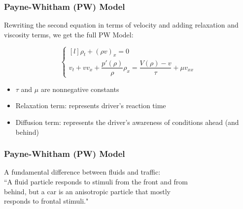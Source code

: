 \documentclass{beamer}
\begin{document}
\begin{frame}
\frametitle{Payne-Whitham (PW) Model}

Rewriting the second equation in terms of velocity and adding relaxation and viscosity terms, we get the full PW Model:

\[ \left\{ \begin{matrix*}[l] \rho_t + (\rho v)_x = 0 \\[2ex] v_t + v v_x + \dfrac{p'(\rho)}{\rho} \rho_x = \dfrac{V(\rho) - v}{\tau} + \mu v_{xx} \end{matrix*} \right. \]

\begin{itemize}
\item $\tau$ and $\mu$ are nonnegative constants
\item Relaxation term: represents driver's reaction time
\item Diffusion term: represents the driver's awareness of conditions ahead (and behind)
\end{itemize}

\end{frame}

\begin{frame}
\frametitle{Payne-Whitham (PW) Model}

\hspace{2em} A fundamental difference between fluids and traffic: \\[3ex]

\hspace{2em} ``A fluid particle responds to stimuli from the front and from \\ 
\hspace{2em} behind, but a car is an anisotropic particle that mostly \\
\hspace{2em} responds to frontal stimuli." \cite{Daganzo1995} 

\end{frame}
\end{document}
